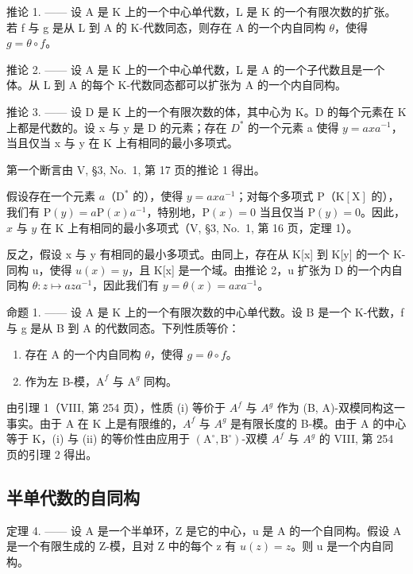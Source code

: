 推论 1. —— 设 A 是 K 上的一个中心单代数，L 是 K 的一个有限次数的扩张。若 f 与 g 是从 L 到 A 的 K-代数同态，则存在 A 的一个内自同构 \(\theta\)，使得 \(g = \theta \circ f\)。

推论 2. —— 设 A 是 K 上的一个中心单代数，L 是 A 的一个子代数且是一个体。从 L 到 A 的每个 K-代数同态都可以扩张为 A 的一个内自同构。

推论 3. —— 设 D 是 K 上的一个有限次数的体，其中心为 K。D 的每个元素在 K 上都是代数的。设 x 与 y 是 D 的元素；存在 \(D^{*}\) 的一个元素 a 使得 \(y = axa^{-1}\)，当且仅当 x 与 y 在 K 上有相同的最小多项式。

第一个断言由 V, §3, No.~1, 第 17 页的推论 1 得出。

假设存在一个元素 \(a\)（\(\mathrm{D}^*\) 的），使得 \(y = axa^{-1}\)；对每个多项式 \(\mathrm{P}\)（\(\mathrm{K}[\mathrm{X}]\) 的），我们有 \(\mathrm{P}(y) = a\mathrm{P}(x)a^{-1}\)，特别地，\(\mathrm{P}(x) = 0\) 当且仅当 \(\mathrm{P}(y) = 0\)。因此，\(x\) 与 \(y\) 在 \(\mathrm{K}\) 上有相同的最小多项式（V, §3, No.~1, 第 16 页，定理 1）。

反之，假设 x 与 y 有相同的最小多项式。由同上，存在从 K{[}x{]} 到 K{[}y{]} 的一个 K-同构 u，使得 \(u(x) = y\)，且 K{[}x{]} 是一个域。由推论 2，u 扩张为 D 的一个内自同构 \(\theta : z \mapsto aza^{-1}\)，因此我们有 \(y = \theta(x) = axa^{-1}\)。

命题 1. —— 设 A 是 K 上的一个有限次数的中心单代数。设 B 是一个 K-代数，f 与 g 是从 B 到 A 的代数同态。下列性质等价：

\begin{enumerate}
\def\labelenumi{(\roman{enumi})}
\item
  存在 A 的一个内自同构 \(\theta\)，使得 \(g = \theta \circ f\)。
\item
  作为左 B-模，\(\mathrm{A}^f\) 与 \(\mathrm{A}^g\) 同构。
\end{enumerate}

由引理 1（VIII, 第 254 页），性质 (i) 等价于 \(A^{f}\) 与 \(A^{g}\) 作为 (B, A)-双模同构这一事实。由于 A 在 K 上是有限维的，\(A^{f}\) 与 \(A^{g}\) 是有限长度的 B-模。由于 A 的中心等于 K，(i) 与 (ii) 的等价性由应用于 \((\mathrm{A}^{\circ}, \mathrm{B}^{\circ})\)-双模 \(A^{f}\) 与 \(A^{g}\) 的 VIII, 第 254 页的引理 2 得出。

\subsection{半单代数的自同构}

定理 4. —— 设 A 是一个半单环，Z 是它的中心，u 是 A 的一个自同构。假设 A 是一个有限生成的 Z-模，且对 Z 中的每个 z 有 \(u(z) = z\)。则 u 是一个内自同构。

